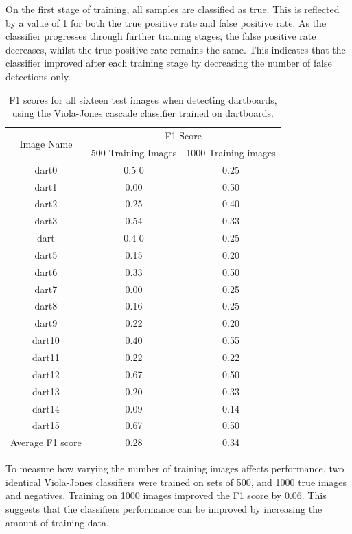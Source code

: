 \documentclass[conference]{IEEEtran}
\begin{document}
On the first stage of training, all samples are classified as true. This is reflected by a value of 1 for both the true positive rate and false positive rate. As the classifier progresses through further training stages, the false positive rate decreases, whilst the true positive rate remains the same. This indicates that the classifier improved after each training stage by decreasing the number of false detections only. 
\begin{table}[!htb]
\caption{F1 scores for all sixteen test images when detecting dartboards, using the Viola-Jones cascade classifier trained on dartboards.}
\begin{center}
\begin{tabular}{||c|c|c||}
\hline
\multirow{2}{*}{Image Name} & \multicolumn{2}{c||}{F1 Score}                \\ 
                                 & 500 Training Images	& 1000 Training images \\ \hline
dart0				& 0.5	0	&	0.25	\\
dart1				& 0.00	&	0.50	\\
dart2				& 0.25	&	0.40	\\
dart3				& 0.54	&	0.33	\\
dart				& 0.4	0	&	0.25	\\
dart5				& 0.15	&	0.20	\\
dart6				& 0.33	&	0.50	\\
dart7				& 0.00	&	0.25	\\
dart8				& 0.16	&	0.25	\\
dart9				& 0.22	&	0.20	\\
dart10			& 0.40	&	0.55	\\
dart11			& 0.22	&	0.22	\\
dart12			& 0.67	&	0.50	\\
dart13			& 0.20	&	0.33	\\
dart14			& 0.09	&	0.14	\\
dart15			& 0.67	&	0.50	\\ \hline
Average F1 score 	& 0.28	&	0.34	\\ \hline
\end{tabular}
\end{center}
\label{default}
\end{table}%
\newpage
\par
To measure how varying the number of training images affects performance, two identical Viola-Jones classifiers were trained on sets of 500, and 1000 true images and negatives. Training on 1000 images improved the F1 score by 0.06. This suggests that the classifiers performance can be improved by increasing the amount of training data. 
\end{document}
